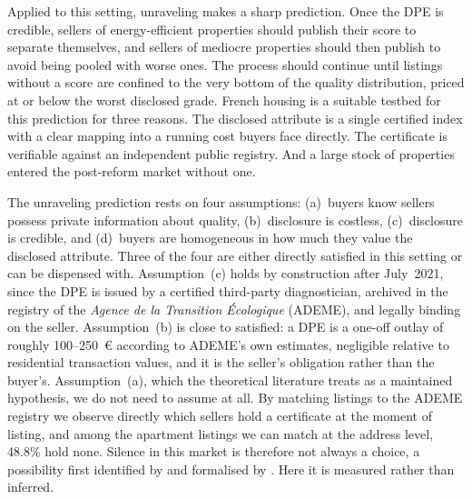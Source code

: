 Applied to this setting, unraveling makes a sharp prediction. Once the DPE is credible, sellers
of energy-efficient properties should publish their score to separate themselves, and sellers of
mediocre properties should then publish to avoid being pooled with worse ones. The process
should continue until listings without a score are confined to the very bottom of the quality
distribution, priced at or below the worst disclosed grade. French housing is a suitable
testbed for this prediction for three reasons. The disclosed attribute is a single certified index with a
clear mapping into a running cost buyers face directly. The certificate is verifiable
against an independent public registry. And a large stock of properties entered the
post-reform market without one.

The unraveling prediction rests on four assumptions: (a)~buyers know sellers possess private
information about quality, (b)~disclosure is costless, (c)~disclosure is credible, and
(d)~buyers are homogeneous in how much they value the disclosed attribute. Three of the four are
either directly satisfied in this setting or can be dispensed with. Assumption~(c) holds by
construction after July~2021, since the DPE is issued by a certified third-party diagnostician,
archived in the registry of the \emph{Agence de la Transition \'Ecologique} (ADEME), and legally
binding on the seller. Assumption~(b) is close to satisfied: a DPE is a one-off outlay of
roughly 100--250~\euro{} according to ADEME's own estimates, negligible relative to
residential transaction values, and it is the seller's obligation rather than the buyer's.
Assumption~(a), which the theoretical literature treats as a maintained hypothesis, we do not
need to assume at all. By matching listings to the ADEME registry we observe directly which
sellers hold a certificate at the moment of listing, and among the apartment listings we can
match at the address level, 48.8\% hold none.
Silence in this market is therefore not always a choice, a possibility first identified by
\citet{dye_disclosure_1985} and formalised by \citet{jung_kwon_1988}. Here it is measured
rather than inferred.

